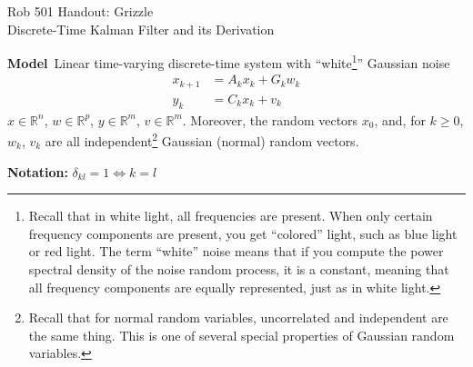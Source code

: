 \documentclass[letterpaper]{article}
\newcommand{\real}{\mathbb R}  %
\begin{document}
\baselineskip=48pt  %


\setlength{\parskip}{.3in}
\setlength{\itemsep}{.3in}

\pagestyle{plain}

{\Large \bf
\begin{center}
Rob 501 Handout: Grizzle \\
Discrete-Time  Kalman Filter and its Derivation
\end{center}
}



\Large

\noindent \textbf{Model}~Linear time-varying discrete-time system with ``white\footnote{Recall that in white light, all frequencies are present. When only certain frequency components are present, you get ``colored'' light, such as blue light or red light. The term ``white'' noise means that if you compute the power spectral density of the noise random process, it is a constant, meaning that all frequency components are equally represented, just as in white light. }'' Gaussian noise
\begin{align*}
x_{k+1} &= A_k x_k + G_k w_k \\
y_k &= C_k x_k + v_k
\end{align*}
$x\in \real^n$, $w \in \real^p$, $y\in \real^m$, $v\in \real^m$. Moreover, the random vectors
$x_0$, and, for $k\ge 0$,  $w_k$, $v_k$ are all independent\footnote{Recall that for normal random variables, uncorrelated and independent are the same thing. This is one of several special properties of Gaussian random variables. } Gaussian (normal) random vectors.

\noindent \textbf{Notation:} $\delta_{kl} = 1 \Leftrightarrow k = l$
\end{document}
